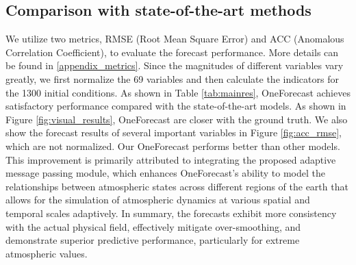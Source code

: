 \subsection{Comparison with state-of-the-art methods}
    We utilize two metrics, RMSE (Root Mean Square Error) and ACC (Anomalous Correlation Coefficient), to evaluate the forecast performance. More details can be found in \ref{appendix_metrics}. Since the magnitudes of different variables vary greatly, we first normalize the 69 variables and then calculate the indicators for the 1300 initial conditions. As shown in Table \ref{tab:mainres}, OneForecast achieves satisfactory performance compared with the state-of-the-art models. As shown in Figure \ref{fig:visual_results}, OneForecast are closer with the ground truth. We also show the forecast results of several important variables in Figure \ref{fig:acc_rmse}, which are not normalized. Our OneForecast performs better than other models. This improvement is primarily attributed to integrating the proposed adaptive message passing module, which enhances OneForecast’s ability to model the relationships between atmospheric states across different regions of the earth that allows for the simulation of atmospheric dynamics at various spatial and temporal scales adaptively. In summary, the forecasts exhibit more consistency with the actual physical field, effectively mitigate over-smoothing, and demonstrate superior predictive performance, particularly for extreme atmospheric values.    %

